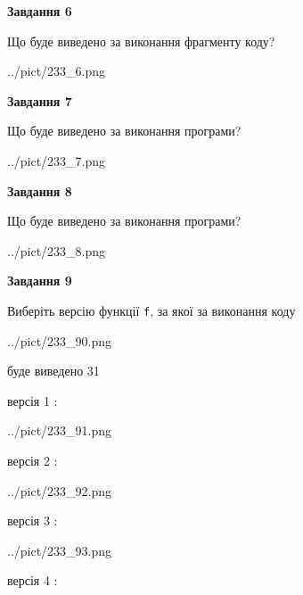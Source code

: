 \documentclass[12pt, ukrainian]{article}
\def\code#1{\Verb!#1!}
\begin{document}
{\begin {large}
{\begin {center}\textbf{Завдання 6}\end {center}}

Що буде виведено за виконання фрагменту коду?\par
\begin{center}
	{../pict/233_6.png}
\end{center}
\newpage

{\begin {center}\textbf{Завдання 7}\end {center}}

Що буде виведено за виконання програми?\par
\begin{center}
	{../pict/233_7.png}
\end{center}
\newpage

{\begin {center}\textbf{Завдання 8}\end {center}}

Що буде виведено за виконання програми?\par
\begin{center}
	{../pict/233_8.png}
\end{center}
\newpage

{\begin {center}\textbf{Завдання 9}\end {center}}

Виберіть версію функції \code{f}, за якої за виконання коду
\begin{center}
	{../pict/233_90.png}
\end{center}
буде виведено 31

\vspace{5mm}
версія 1 :

\begin{center}
	{../pict/233_91.png}
\end{center}
версія 2 :

\begin{center}
	{../pict/233_92.png}
\end{center}
версія 3 :

\begin{center}
	{../pict/233_93.png}
\end{center}
версія 4 :


\end{large}}
\end{document}
